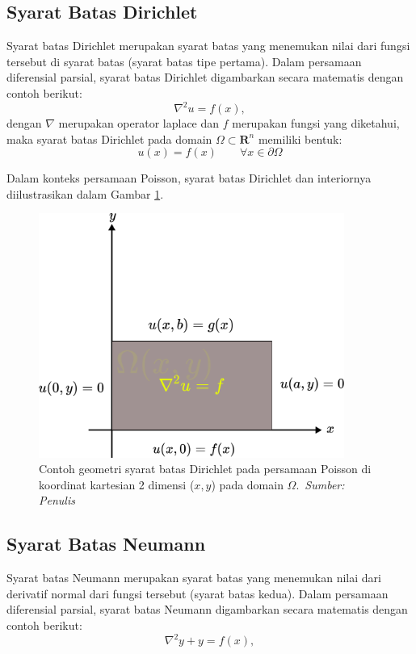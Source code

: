 \subsection{Syarat Batas Dirichlet}
Syarat batas Dirichlet merupakan syarat batas yang menemukan nilai dari fungsi tersebut di syarat batas (syarat batas tipe pertama). Dalam persamaan diferensial parsial, syarat batas Dirichlet digambarkan secara matematis dengan contoh berikut:
\begin{equation*}
    \nabla^2 u = f(x),
\end{equation*}
dengan $\nabla$ merupakan operator laplace dan $f$ merupakan fungsi yang diketahui, maka syarat batas Dirichlet pada domain $\Omega \subset \textbf{R}^n$ memiliki bentuk:
\begin{equation}
    u(x) = f(x)\quad \quad \forall x \in \partial \Omega
\end{equation}

Dalam konteks persamaan Poisson, syarat batas Dirichlet dan interiornya diilustrasikan dalam Gambar \ref{gambar dirichlet}.

\begin{figure}[h]
    \centering
    \includegraphics[width=10cm]{gambar/dirichlet.png}
    \caption{Contoh geometri syarat batas Dirichlet pada persamaan Poisson di koordinat kartesian 2 dimensi ($x,y$) pada domain $\Omega$.\ \emph{Sumber: Penulis}}
    \label{gambar dirichlet}
\end{figure}

\subsection{Syarat Batas Neumann}
Syarat batas Neumann merupakan syarat batas yang menemukan nilai dari derivatif normal dari fungsi tersebut (syarat batas kedua). Dalam persamaan diferensial parsial, syarat batas Neumann digambarkan secara matematis dengan contoh berikut:
\begin{equation*}
    \nabla^2 y + y = f(x),
\end{equation*}

